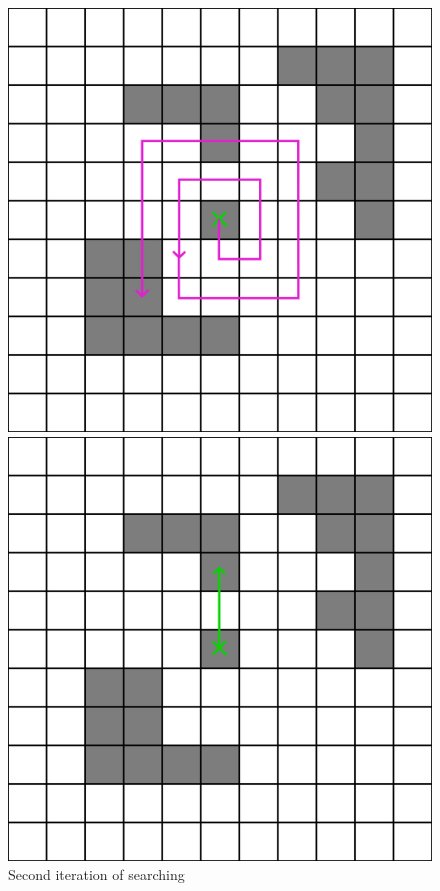 \documentclass[titlepage]{article}
\newcommand{\multifigcaption}{\captionsetup{justification=justified}}
\begin{document}
\begin{figure}[H]
 	\begin{center}
 		\begin{minipage}{0.45\linewidth}
 			\includegraphics[width=\textwidth]{img/greedy/example-neighbours-neigh-2.png}
 			\multifigcaption
 			\caption{Second iteration of searching}
 			\label{img:greedy/example-neighbours-neigh-2}
 		\end{minipage}
 		\hspace{.05\linewidth}
 		\begin{minipage}{.45\linewidth}
 			\includegraphics[width=\textwidth]{img/greedy/example-neighbours-neigh-solv.png}

\end{minipage}
\end{center}
\end{figure}
\end{document}
